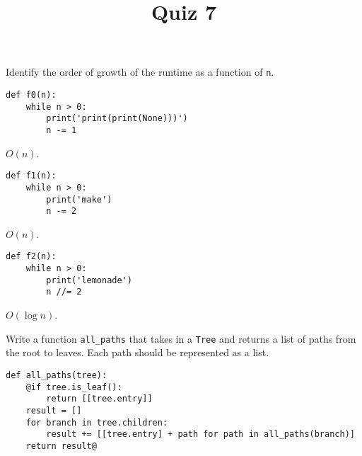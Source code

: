 \documentclass[twoside]{article}
\title{\sc Quiz 7 \solution{Solutions}}
\newcommand{\solution}[1]{{\color{red}#1}}
\begin{document}
\maketitle

\begin{enumerate}

Identify the order of growth of the runtime as a function of \lstinline{n}.
\vspace{0.1in}

\begin{lstlisting}
def f0(n):
    while n > 0:
        print('print(print(None)))')
        n -= 1
\end{lstlisting}
\solution{$O(n)$.}
~\\

\begin{lstlisting}
def f1(n):
    while n > 0:
        print('make')
        n -= 2
\end{lstlisting}
\solution{$O(n)$.}
~\\

\begin{lstlisting}
def f2(n):
    while n > 0:
        print('lemonade')
        n //= 2
\end{lstlisting}
\solution{$O(\log{n})$.}
~\\

\newpage


Write a function \lstinline{all_paths} that takes in a \lstinline{Tree} and returns a list of paths from the root to leaves. Each path should be represented as a list.

\begin{lstlisting}
def all_paths(tree):
    @if tree.is_leaf():
        return [[tree.entry]]
    result = []
    for branch in tree.children:
        result += [[tree.entry] + path for path in all_paths(branch)]
    return result@
\end{lstlisting}

\end{enumerate}
\end{document}
